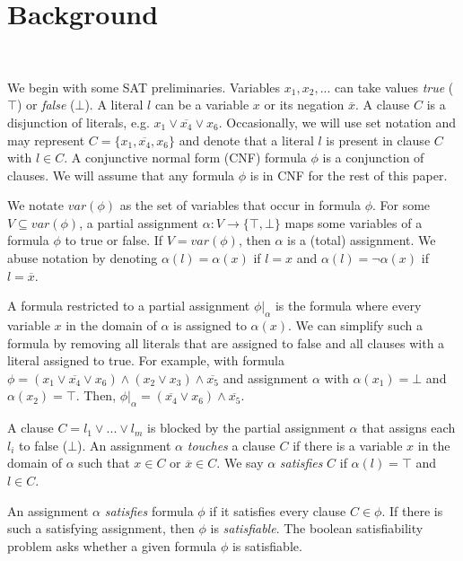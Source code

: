 \section{Background}~\label{sec:background}

We begin with some SAT preliminaries. Variables $x_1, x_2, ...$ can take values \emph{true} ($\top$) or \emph{false} ($\bot$). A literal $l$ can be a variable $x$ or its negation $\overline{x}$. A clause $C$ is a disjunction of literals, e.g. $x_1 \lor \overline{x_4} \lor x_6$. Occasionally, we will use set notation and may represent $C = \{x_1, \overline{x_4}, x_6\}$ and denote that a literal $l$ is present in clause $C$ with $l \in C$. A conjunctive normal form (CNF) formula $\phi$ is a conjunction of clauses. We will assume that any formula $\phi$ is in CNF for the rest of this paper.

We notate $var(\phi)$ as the set of variables that occur in formula $\phi$. For some $V \subseteq var(\phi)$, a partial assignment $\alpha : V \rightarrow \{\top, \bot\}$  maps some variables of a formula $\phi$ to true or false. If $V = var(\phi)$, then $\alpha$ is a (total) assignment. We abuse notation by denoting $\alpha(l) = \alpha(x)$ if $l = x$ and $\alpha(l) = \neg \alpha(x)$ if $l = \overline{x}$.

A formula restricted to a partial assignment $\phi|_\alpha$ is the formula where every variable $x$ in the domain of $\alpha$ is assigned to $\alpha(x)$. We can simplify such a formula by removing all literals that are assigned to false and all clauses with a literal assigned to true. For example, with formula $\phi = (x_1 \lor \overline{x_4} \lor x_6) \land (x_2 \lor x_3) \land \overline{x_5}$ and assignment $\alpha$ with $\alpha(x_1) = \bot$ and $\alpha(x_2) = \top$. Then, $\phi|_\alpha = (\overline{x_4} \lor x_6) \land \overline{x_5}$.

A clause $C = l_1 \lor ... \lor l_m$ is blocked by the partial assignment $\alpha$ that assigns each $l_i$ to false ($\bot$).
An assignment $\alpha$ \emph{touches} a clause $C$ if there is a variable $x$ in the domain of $\alpha$ such that $x \in C$ or $\overline{x} \in C$. We say $\alpha$ \emph{satisfies} $C$ if $\alpha(l) = \top$ and $l \in C$.

An assignment $\alpha$ \emph{satisfies} formula $\phi$ if it satisfies every clause $C \in \phi$. If there is such a satisfying assignment, then $\phi$ is \emph{satisfiable}. The boolean satisfiability problem asks whether a given formula $\phi$ is satisfiable.

